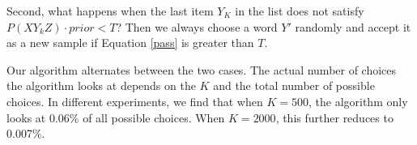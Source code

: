  Second, what happens when the last item $Y_{K}$ in the list does not satisfy $P(XY_{k}Z)\cdot prior<T$? Then we always choose a word $Y'$ randomly and accept it as a new sample if Equation \ref{pass} is greater than $T$.

 Our algorithm alternates between the two cases. The actual number of choices the algorithm looks at depends on the $K$ and the total number of possible choices. In different experiments, we find that when $K=500$, the algorithm only looks at 0.06\% of all possible choices. When $K=2000$, this further reduces to 0.007\%.